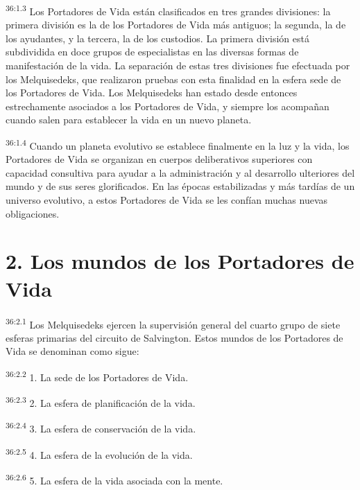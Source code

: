 \par
\textsuperscript{36:1.3} Los Portadores de Vida están clasificados en tres grandes divisiones: la primera división es la de los Portadores de Vida más antiguos; la segunda, la de los ayudantes, y la tercera, la de los custodios. La primera división está subdividida en doce grupos de especialistas en las diversas formas de manifestación de la vida. La separación de estas tres divisiones fue efectuada por los Melquisedeks, que realizaron pruebas con esta finalidad en la esfera sede de los Portadores de Vida. Los Melquisedeks han estado desde entonces estrechamente asociados a los Portadores de Vida, y siempre los acompañan cuando salen para establecer la vida en un nuevo planeta.

\par
\textsuperscript{36:1.4} Cuando un planeta evolutivo se establece finalmente en la luz y la vida, los Portadores de Vida se organizan en cuerpos deliberativos superiores con capacidad consultiva para ayudar a la administración y al desarrollo ulteriores del mundo y de sus seres glorificados. En las épocas estabilizadas y más tardías de un universo evolutivo, a estos Portadores de Vida se les confían muchas nuevas obligaciones.

\section*{2. Los mundos de los Portadores de Vida}
\par
\textsuperscript{36:2.1} Los Melquisedeks ejercen la supervisión general del cuarto grupo de siete esferas primarias del circuito de Salvington. Estos mundos de los Portadores de Vida se denominan como sigue:

\par
\textsuperscript{36:2.2} 1. La sede de los Portadores de Vida.

\par
\textsuperscript{36:2.3} 2. La esfera de planificación de la vida.

\par
\textsuperscript{36:2.4} 3. La esfera de conservación de la vida.

\par
\textsuperscript{36:2.5} 4. La esfera de la evolución de la vida.

\par
\textsuperscript{36:2.6} 5. La esfera de la vida asociada con la mente.

